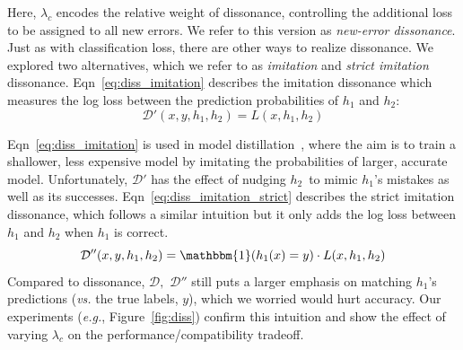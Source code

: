 \documentclass[letterpaper]{article} %
\newcommand{\eg}{\mbox{\it e.g.}}
\newcommand{\?}{\mbox{?}}
\newcommand{\hone}{\mbox{$h_1$}}
\newcommand{\htwo}{\mbox{$h_2$}}
\newcommand{\loss}{L}
\newcommand{\lambdabc}{\lambda_c}
\newcommand{\dissonance}{\mathcal{D}}
\begin{document}
\noindent Here, $\lambdabc$ encodes the relative weight of dissonance, controlling the additional loss to be assigned to all new errors.
We refer to this version as {\em new-error dissonance}.
Just as with classification loss, there are other ways to realize dissonance. We explored two alternatives, which we refer to as {\em imitation} and {\em strict imitation} dissonance.
Eqn~\ref{eq:diss_imitation} describes the imitation dissonance which measures the log loss between the prediction probabilities of $\hone$ and $\htwo$:
\begin{equation}
    \label{eq:diss_imitation}
    \dissonance'(x, y, \hone, \htwo) = \loss(x, \hone, \htwo)
\end{equation}

\noindent Eqn~\ref{eq:diss_imitation} is used in model distillation~\cite{ba2014deep,hinton2015distilling}, where the aim is to train a shallower, less expensive model by imitating the probabilities of larger, accurate model. Unfortunately, $\dissonance'$ has the effect of nudging \htwo\ to mimic \hone's mistakes as well as its successes.  
Eqn~\ref{eq:diss_imitation_strict} describes the strict imitation dissonance, which follows a similar intuition but it only adds the log loss between $\hone$ and $\htwo$ when $\hone$ is correct.
\begin{equation}
    \label{eq:diss_imitation_strict}
    \dissonance''(x, y, \hone, \htwo) = \mathbbm{1}(\hone(x) = y) \cdot \loss(x, \hone, \htwo)
\end{equation}
\noindent Compared to dissonance, $\dissonance,$  $\dissonance''$ still puts a larger emphasis on matching \hone's predictions ({\em vs.} the true labels, $y$), which we worried would hurt accuracy. Our experiments (\eg, Figure~\ref{fig:diss}) confirm this intuition and show the effect of varying
$\lambdabc$ on the performance/compatibility tradeoff. %
\end{document}

